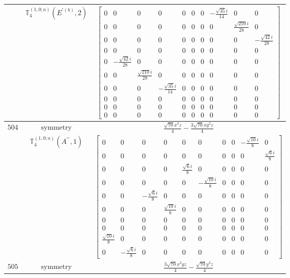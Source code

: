 \documentclass[fleqn,8pt,landscape]{jsarticle}
\begin{document}
\begin{longtable}{ccc}
$  $ & $ \mathbb{T}_{4}^{(1,0;a)}(E^{\prime(b)},2) $ & $ \begin{bmatrix} 0 & 0 & 0 & 0 & 0 & 0 & 0 & - \frac{\sqrt{35} i}{14} & 0 & 0 \\ 0 & 0 & 0 & 0 & 0 & 0 & 0 & 0 & \frac{\sqrt{210} i}{28} & 0 \\ 0 & 0 & 0 & 0 & 0 & 0 & 0 & 0 & 0 & - \frac{\sqrt{42} i}{28} \\ 0 & 0 & 0 & 0 & 0 & 0 & 0 & 0 & 0 & 0 \\ 0 & - \frac{\sqrt{42} i}{28} & 0 & 0 & 0 & 0 & 0 & 0 & 0 & 0 \\ 0 & 0 & \frac{\sqrt{210} i}{28} & 0 & 0 & 0 & 0 & 0 & 0 & 0 \\ 0 & 0 & 0 & - \frac{\sqrt{35} i}{14} & 0 & 0 & 0 & 0 & 0 & 0 \\ 0 & 0 & 0 & 0 & 0 & 0 & 0 & 0 & 0 & 0 \\ 0 & 0 & 0 & 0 & 0 & 0 & 0 & 0 & 0 & 0 \\ 0 & 0 & 0 & 0 & 0 & 0 & 0 & 0 & 0 & 0 \end{bmatrix} $ \\ \hline
$ 504 $ & $ \text{symmetry} $ & $ \frac{\sqrt{70} x^{3} z}{4} - \frac{3 \sqrt{70} x y^{2} z}{4} $ \\
$  $ & $ \mathbb{T}_{4}^{(1,0;a)}(A^{\prime\prime},1) $ & $ \begin{bmatrix} 0 & 0 & 0 & 0 & 0 & 0 & 0 & 0 & - \frac{\sqrt{10} i}{8} & 0 \\ 0 & 0 & 0 & 0 & 0 & 0 & 0 & 0 & 0 & \frac{\sqrt{6} i}{8} \\ 0 & 0 & 0 & 0 & \frac{\sqrt{6} i}{8} & 0 & 0 & 0 & 0 & 0 \\ 0 & 0 & 0 & 0 & 0 & - \frac{\sqrt{10} i}{8} & 0 & 0 & 0 & 0 \\ 0 & 0 & - \frac{\sqrt{6} i}{8} & 0 & 0 & 0 & 0 & 0 & 0 & 0 \\ 0 & 0 & 0 & \frac{\sqrt{10} i}{8} & 0 & 0 & 0 & 0 & 0 & 0 \\ 0 & 0 & 0 & 0 & 0 & 0 & 0 & 0 & 0 & 0 \\ 0 & 0 & 0 & 0 & 0 & 0 & 0 & 0 & 0 & 0 \\ \frac{\sqrt{10} i}{8} & 0 & 0 & 0 & 0 & 0 & 0 & 0 & 0 & 0 \\ 0 & - \frac{\sqrt{6} i}{8} & 0 & 0 & 0 & 0 & 0 & 0 & 0 & 0 \end{bmatrix} $ \\ \hline
$ 505 $ & $ \text{symmetry} $ & $ \frac{3 \sqrt{70} x^{2} y z}{4} - \frac{\sqrt{70} y^{3} z}{4} $ \\

\end{longtable}
\end{document}
